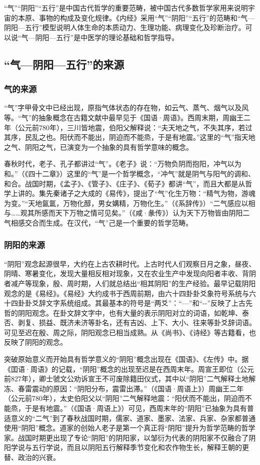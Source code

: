 \documentclass[draft,12pt]{ctexbook}
\begin{document}
“气”“阴阳”“五行”是中国古代哲学的重要范畴，被中国古代多数哲学家用来说明宇宙的本原、事物的构成及变化规律。《内经》采用“气”“阴阳”“五行”的范畴和“气—阴阳—五行”模型说明人体生命的本质动力、生理功能、病理变化及珍断治疗。可以说“气—阴阳—五行”是中医学的理论基础和哲学指导。

\subsection{“气—阴阳—五行”的来源}%

\subsubsection{气的来源}%

“气”字甲骨文中已经出现，原指气体状态的存在物，如云气、蒸气、烟气以及风等。“气”的抽象概念在古籍文献中最早见于《国语·周语》。西周末期，周幽王二年（公元前780年），三川皆地震，伯阳父解释说：“夫天地之气，不失其序，若过其序，民乱之也。阳伏而不能出，阴迫而不能烝，于是有地震。”这里的“气”指天地之气、阴阳之气，已演变为一个抽象的具有哲学意味的概念。

春秋时代，老子、孔子都讲过“气”。《老子》说：“万物负阴而抱阳，冲气以为和。”（《四十二章》）这里的“气”是一个哲学概念，“冲气”就是阴气与阳气的调和、和合。战国时期，《孟子》、《管子》、《庄子》、《荀子》都讲“气”，而且大都是从哲学上讲的。集先秦诸子之大成的《易传》，提出了“气”化生万物：“精气为物，游魂为变。”“天地氤氲，万物化醇，男女媾精，万物化生。”（《系辞传》）“二气感应以相与……观其所感而天下万物之情可见矣。”（《咸·彖传》）认为天下万物皆由阴阳二气相感交合而生成。在汉代，“气”己是一个重要的哲学范畴。

\subsubsection{阴阳的来源}%

“阴阳”观念起源很早，大约在上古农耕时代。上古时代人们观察日月之象，昼夜、阴晴、寒暑变化，发现大量相反相对现象，又在农业生产中发现向阳者丰收、背阴者减产等现象，殷、周时期，人们就总结出“相其阴阳”的生产经验。最早记载阴阳观念的是《易经》。《易经》大约成书于西周前期，由六十四卦卦爻象符号系统与六十四卦卦爻辞文字系统组成。其最基本的符号是“两爻”：“—”和“-{-}”反映了上古先哲的阴阳观念。在卦文辞文字中，也有大量的表示阴阳对立的词语，如乾坤、泰否、剥复、损益、既济未济等卦名，还有吉凶、上下、大小、往来等卦爻辞词语。可见至迟在殷、周之际，阴阳观念已相当成熟。从《尚书》、《诗经》等古籍看，也反映了阴阳的观念。

突破原始意义而开始具有哲学意义的“阴阳”概念出现在《国语》、《左传》中。据《囯语·周语》的记载，“阴阳”概念的出现至迟是在西周末年。周宣王即位（公元前827年），卿士虢文公劝诉宣王不可废除籍田仪式，其中以“阴阳”二气解释土地解冻、春雷震动的原因：“阴阳分布，震雷出滞。”（《国语·周语上》）周幽王二年（公元前780年），太史伯阳父以“阴阳”二气解释地震：“阳伏而不能出，阴迫而不能烝，于是有地震。”（《国语·周语上》）可见，西周末年的“阴阳”已抽象为具有普适意义的“二气”到了春秋战国时期，儒家、道家、墨家、法家、兵家、杂家都普通使用“阴阳”概念。道家的创始人老子是第一个真正将“阴阳”提升为哲学范畴的哲学家。战国时期更出现了专论“阴阳”的阴阳家，以邹衍为代表的阴阳家不仅融合了阴阳学说与五行学说，而且以阴阳五行解释季节变化和农作物生长，解释王朝的更替、政治的兴衰。
\end{document}
